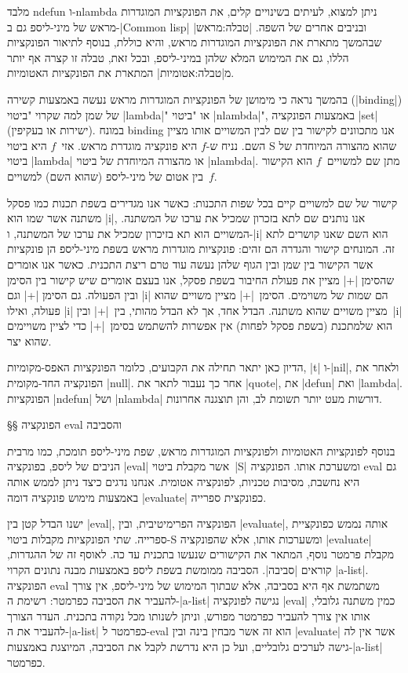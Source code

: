 מלבד ndefun ו-nlambda ניתן למצוא, לעיתים בשינויים קלים, את הפונקציות המוגדרות
מראש של מיני-ליספ גם ב-\E|Common lisp| ובניבים אחרים של השפה.
|טבלה:מראש| שבהמשך מתארת את הפונקציות המוגדרות מראש, והיא כוללת, בנוסף
לתיאור הפונקציות הללו, גם את המימוש המלא שלהן במיני-ליספ, ובכל זאת, טבלה זו
קצרה אף יותר מ|טבלה:אטומיות| המתארת את הפונקציות האטומיות.

בהמשך נראה כי מימושן של הפונקציות המוגדרות מראש נעשה באמצעות קשירה
(\E|binding|) של שמן למה שקרוי "ביטוי \E|lambda|" או "ביטוי \E|nlambda|",
באמצעות הפונקציה \E|set| (ישירות או בעקיפין). במונח binding אנו מתכוונים לקישור
בין שם לבין המשויים אותו מציין השם. נניח ש-$f$ היא פונקציה מוגדרת מראש. אזי~$f$
היא ביטוי S שהוא מהצורה המיוחדת של ביטוי \E|lambda| או מהצורה המיוחדת של
ביטוי \E|nlambda|. מתן שם למשויים~$f$ הוא הקישור בין אטום של מיני-ליספ (שהוא
השם) למשויים~$f$.

קישור של שם למשויים קיים בכל שפות התכנות: כאשר אנו מגדירים בשפת תכנות כמו פסקל
משתנה אשר שמו הוא \T|i|, אנו נותנים שם לתא בזכרון שמכיל את ערכו של המשתנה.
המשויים הוא תא בזיכרון שמכיל את ערכו של המשתנה, ו-\T|i| הוא השם שאנו קושרים לתא
זה. המונחים קישור והגדרה הם זהים: פונקציות מוגדרות מראש בשפת מיני-ליספ הן
פונקציות אשר הקישור בין שמן ובין הגוף שלהן נעשה עוד טרם ריצת התכנית. כאשר אנו
אומרים שהסימן \T|+| מציין את פעולת החיבור בשפת פסקל, אנו בעצם אומרים שיש קישור
בין הסימן ובין הפעולה. גם הסימן \T|+| וגם \T|i| הם שמות של משוימים. הסימן~\T|+|
מציין משויים שהוא פעולה, ואילו \T|i| מציין משויים שהוא משתנה. הבדל אחד, אך לא
הבדל מהותי, בין~\T|+| ובין~\T|i| הוא שלמתכנת (בשפת פסקל לפחות) אין אפשרות
להשתמש בסימן~\T|+| כדי לציין משויימים שהוא יצר.

הדיון כאן יתאר תחילה את הקבועים, כלומר הפונקציות האפס-מקומיות, \E|t| ו-\E|nil|,
ולאחר את הפונקציה החד-מקומית \E|null|. אחר כך נעבור לתאר את \E|quote|, את
\E|defun| ואת \E|lambda|. הפונקציות \E|ndefun| ושל \E|nlambda| דורשות מעט יותר
תשומת לב, והן תוצגנה אחרונות.

§§ הפונקציה eval והסביבה

בנוסף לפונקציות האטומיות ולפונקציות המוגדרות מראש, שפת מיני-ליספ תומכת, כמו
מרבית הניבים של ליספ, בפונקציה \E|eval| אשר מקבלת ביטוי~\E|S| ומשערכת אותו.
הפונקציה eval גם היא נחשבת, מסיבות טכניות, לפונקציה אטומית. אנחנו נדגים כיצד
ניתן לממש אותה באמצעות מימוש פונקציה דומה \E|evaluate| כפונקצית ספרייה.

ישנו הבדל קטן בין \E|eval|, הפונקציה הפרימיטיבית, ובין \E|evaluate|, אותה נממש
כפונקציית ספרייה. שתי הפונקציות מקבלות ביטוי-S ומשערכות אותו, אלא שהפונקציה
\E|evaluate| מקבלת פרמטר נוסף, המתאר את הקישורים שנעשו בתכנית עד כה.
לאוסף זה של ההגדרות, קוראים \ע|סביבה|. הסביבה ממומשת בשפת ליספ באמצעות
מבנה נתונים הקרוי \E|a-list|. הפונקציה eval משתמשת אף היא בסביבה, אלא שבתוך
המימוש של מיני-ליספ, אין צורך להעביר את הסביבה כפרמטר: רשימת ה-\E|a-list| נגישה
לפונקציה \E|eval| כמין משתנה גלובלי, אותו אין צורך להעביר כפרמטר מפורש, וניתן
לשנותו מכל נקודה בתכנית. העדר הצורך להעביר את ה-\E|a-list| כפרמטר ל-eval הוא זה
אשר מבחין בינה ובין \E|evaluate| אשר אין לה גישה לערכים גלובליים, ועל כן היא
נדרשת לקבל את הסביבה, המיוצגת באמצעות-\E|a-list| כפרמטר.

